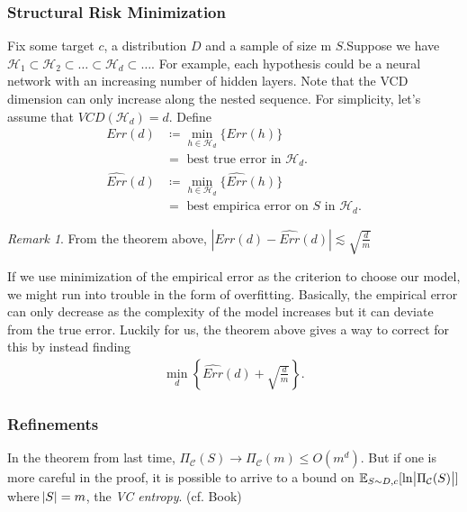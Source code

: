 \documentclass[12pt, letterpaper]{article}
\numberwithin{equation}{section} %
\newcommand{\mb}{\mathbb}
\newcommand{\mc}{\mathcal}
\theoremstyle{definition}
\theoremstyle{remark}
\newtheorem{remark}[theorem]{Remark}
\begin{document}
\subsubsection{Structural Risk Minimization}
Fix some target $c$, a distribution $D$ and a sample of size m $S$.Suppose we have $\mc H_1 \subset \mc H_2 \subset \ldots \subset \mc H_d \subset \ldots$. For example, each hypothesis could be a neural network with an increasing number of hidden layers. Note that the VCD dimension can only increase along the nested sequence. For simplicity, let's assume that $VCD(\mc H_d) = d$. Define
\begin{align}
    Err(d) &\coloneqq \min\limits_{h \in \mc H_d}\lbrace Err(h) \rbrace \\
    &=\textrm{ best true error in $\mc H_d$}.\\
    \widehat{Err}(d) &\coloneqq \min\limits_{h \in \mc H_d}\lbrace \widehat{Err}(h) \rbrace \\
        &=\textrm{ best empirica error on $S$ in $\mc H_d$}.
\end{align}
\begin{remark}
    From the theorem above, $|Err(d)-\widehat{Err}(d)|\lesssim \sqrt{\frac dm}$
\end{remark}

If we use minimization of the empirical error as the criterion to choose our model, we might run into trouble in the form of overfitting. Basically, the empirical error can only decrease as the complexity of the model increases but it can deviate from the true error. Luckily for us, the theorem above gives a way to correct for this by instead finding
\begin{align}
    \min\limits_d\left\{\widehat{Err}(d) + \sqrt{\frac dm}\right\}.
\end{align}

\subsubsection{Refinements}
In the theorem from last time, $\Pi_{\mc C}(S) \rightarrow \Pi_{\mc C}(m) \leq O(m^d)$. But if one is more careful in the proof, it is possible to arrive to a bound on $\mb E_{S\sim D, c}[\ln \abs{\Pi_{\mc C}(S)}]$ where $\abs{S}=m$, the \emph{VC entropy}. (cf. Book)
\end{document}
